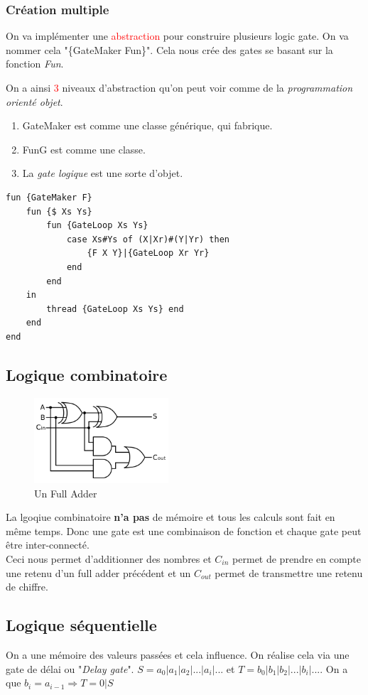 \documentclass{report}
\begin{document}
\subsubsection{Création multiple}
On va implémenter une \textcolor{red}{abstraction} pour construire plusieurs logic gate. On va nommer cela "\{GateMaker Fun\}". Cela nous crée des gates se basant sur la fonction \textit{Fun}.\par
On a ainsi \textcolor{red}{3} niveaux d'abstraction qu'on peut voir comme de la \textit{programmation orienté objet}.
\begin{enumerate}
\item GateMaker est comme une classe générique, qui fabrique.
\item FunG est comme une classe.
\item La \textit{gate logique} est une sorte d'objet.
\end{enumerate}
\begin{lstlisting}[escapechar=\%]
fun {GateMaker F} 
	fun {$ Xs Ys} 
		fun {GateLoop Xs Ys} 
			case Xs#Ys of (X|Xr)#(Y|Yr) then
				{F X Y}|{GateLoop Xr Yr}
			end 
		end 
	in 
		thread {GateLoop Xs Ys} end 
	end
end
\end{lstlisting}

\subsection{Logique combinatoire}
\begin{figure}
\centering
\includegraphics[width=5cm]{img/fullAdder.png}
\caption{Un Full Adder}
\end{figure}
La lgoqiue combinatoire \textbf{n'a pas} de mémoire et tous les calculs sont fait en même temps. Donc une gate est une combinaison de fonction et chaque gate peut être inter-connecté.\\
Ceci nous permet d'additionner des nombres et $C_{in}$  permet de prendre en compte une retenu d'un full adder précédent et un $C_{out}$ permet de transmettre une retenu de chiffre.

\subsection{Logique séquentielle}
On a une mémoire des valeurs passées et cela influence. On réalise cela via une gate de délai ou "\textit{Delay gate}". $S=a_0 | a_1 | a_2 | ... | a_i | ...$ et $T=b_0 | b_1 | b_2 | ... | b_i | ...$. On a que $b_i = a_{i-1} \Rightarrow T=0|S$
\end{document}
